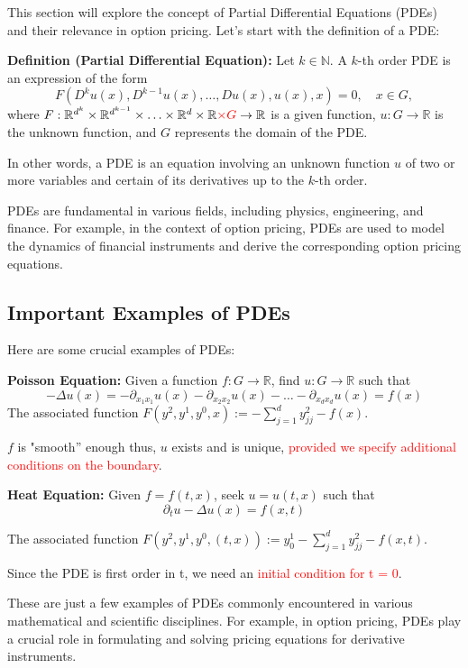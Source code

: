 This section will explore the concept of Partial Differential Equations (PDEs) and their relevance in option pricing. Let's start with the definition of a PDE:

\textbf{Definition (Partial Differential Equation):}
Let $k \in \mathbb{N}$. A $k$-th order PDE is an expression of the form
\[F(D^k u(x), D^{k-1} u(x), \ldots, Du(x), u(x), x) = 0, \quad x \in G,\]
where $F : \mathbb{R}^{d^k} \times \mathbb{R}^{d^{k-1}} \times \ldots \times \mathbb{R}^d \times \mathbb{R} \textcolor{red}{\times G} \rightarrow \mathbb{R}$ is a given function, $u : G \rightarrow \mathbb{R}$ is the unknown function, and $G$ represents the domain of the PDE.

In other words, a PDE is an equation involving an unknown function $u$ of two or more variables and certain of its derivatives up to the $k$-th order.

PDEs are fundamental in various fields, including physics, engineering, and finance. For example, in the context of option pricing, PDEs are used to model the dynamics of financial instruments and derive the corresponding option pricing equations.

\subsection{Important Examples of PDEs}

Here are some crucial examples of PDEs:

\textbf{Poisson Equation:}
Given a function $f : G \rightarrow \mathbb{R}$, find $u : G \rightarrow \mathbb{R}$ such that
\[-\Delta u(x) = -\partial_{x_1 x_1} u(x) - \partial_{x_2 x_2} u(x) - \ldots - \partial_{x_d x_d} u(x) = f(x)\]
The associated function $F(y^2, y^1, y^0, x) := -\sum_{j=1}^d y^{2}_{j j} - f(x)$.

$f$ is "smooth” enough thus, $u$ exists and is unique, \textcolor{red}{provided we specify
additional conditions on the boundary}.

\textbf{Heat Equation:}
Given $f = f(t, x)$, seek $u = u(t, x)$ such that
\[\partial_t u - \Delta u(x) = f(x, t)\]

The associated function $F(y^2, y^1, y^0, (t, x)) := y^1_0 - \sum_{j=1}^d y^{2}_{j j} - f(x, t)$.

Since the PDE is first order in t, we need an \textcolor{red}{initial condition for t = 0}.

These are just a few examples of PDEs commonly encountered in various mathematical and scientific disciplines. For example, in option pricing, PDEs play a crucial role in formulating and solving pricing equations for derivative instruments.

